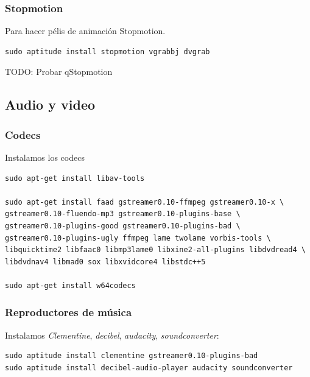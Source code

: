 \documentclass[12pt,spanish,]{scrartcl}
\begin{document}
\hypertarget{stopmotion}{%
\subsubsection{Stopmotion}\label{stopmotion}}

Para hacer pélis de animación Stopmotion.

\begin{verbatim}
sudo aptitude install stopmotion vgrabbj dvgrab
\end{verbatim}

TODO: Probar qStopmotion

\hypertarget{audio-y-video}{%
\subsection{Audio y video}\label{audio-y-video}}

\hypertarget{codecs}{%
\subsubsection{Codecs}\label{codecs}}

Instalamos los codecs

\begin{verbatim}
sudo apt-get install libav-tools

sudo apt-get install faad gstreamer0.10-ffmpeg gstreamer0.10-x \
gstreamer0.10-fluendo-mp3 gstreamer0.10-plugins-base \
gstreamer0.10-plugins-good gstreamer0.10-plugins-bad \
gstreamer0.10-plugins-ugly ffmpeg lame twolame vorbis-tools \
libquicktime2 libfaac0 libmp3lame0 libxine2-all-plugins libdvdread4 \
libdvdnav4 libmad0 sox libxvidcore4 libstdc++5

sudo apt-get install w64codecs
\end{verbatim}

\hypertarget{reproductores-de-muxfasica}{%
\subsubsection{Reproductores de
música}\label{reproductores-de-muxfasica}}

Instalamos \emph{Clementine}, \emph{decibel}, \emph{audacity},
\emph{soundconverter}:

\begin{verbatim}
sudo aptitude install clementine gstreamer0.10-plugins-bad
sudo aptitude install decibel-audio-player audacity soundconverter
\end{verbatim}
\end{document}
